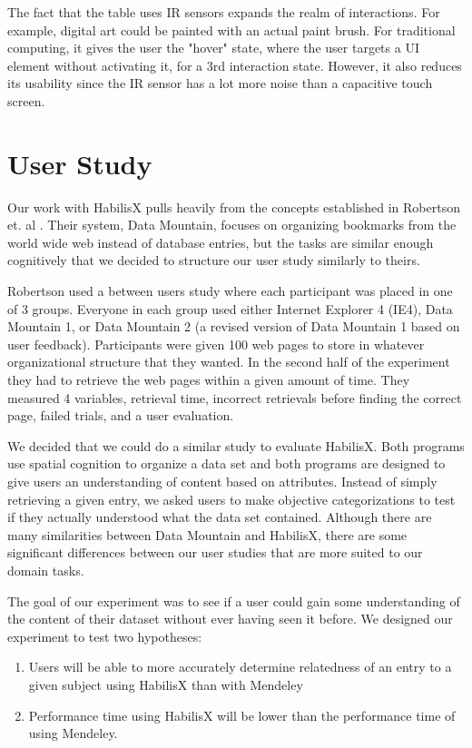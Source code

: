 \documentclass{article}
\begin{document}
The fact that the table uses IR sensors expands the realm of interactions.  For example, digital art could be painted with an actual paint brush.  For traditional computing, it gives the user the "hover" state, where the user targets a UI element without activating it, for a 3rd interaction state.  However, it also reduces its usability since the IR sensor has a lot more noise than a capacitive touch screen.  

\section{User Study}

Our work with HabilisX pulls heavily from the concepts established in Robertson et. al \cite{Robertson1998}.  Their system, Data Mountain, focuses on organizing bookmarks from the world wide web instead of database entries, but the tasks are similar enough cognitively that we decided to structure our user study similarly to theirs.  

Robertson used a between users study where each participant was placed in one of 3 groups.  Everyone in each group used either Internet Explorer 4 (IE4), Data Mountain 1, or Data Mountain 2 (a revised version of Data Mountain 1 based on user feedback).  Participants were given 100 web pages to store in whatever organizational structure that they wanted.  In the second half of the experiment they had to retrieve the web pages within a given amount of time.  They measured 4 variables, retrieval time, incorrect retrievals before finding the correct page, failed trials, and a user evaluation.  

We decided that we could do a similar study to evaluate HabilisX.  Both programs use spatial cognition to organize a data set and both programs are designed to give users an understanding of content based on attributes.  Instead of simply retrieving a given entry, we asked users to make objective categorizations to test if they actually understood what the data set contained.  Although there are many similarities between Data Mountain and HabilisX, there are some significant differences between our user studies that are more suited to our domain tasks.   

The goal of our experiment was to see if a user could gain some understanding of the content of their dataset without ever having seen it before.  We designed our experiment to test two hypotheses:  

\begin{enumerate}
\item{Users will be able to more accurately determine relatedness of an entry to a given subject using HabilisX than with Mendeley}
\item{Performance time using HabilisX will be lower than the performance time of using Mendeley.}
\end{enumerate}
\end{document}

